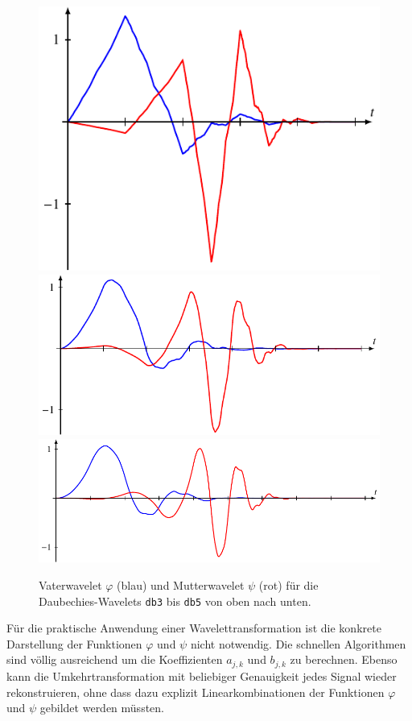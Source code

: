 \begin{figure}
\includegraphics{chapters/7-algo/images/db3.pdf}\\
\includegraphics{chapters/7-algo/images/db4.pdf}\\
\includegraphics{chapters/7-algo/images/db5.pdf}
\caption{Vaterwavelet $\varphi$ (blau) und Mutterwavelet $\psi$
(rot) für die Daubechies-Wavelets \texttt{db3} bis \texttt{db5}
von oben nach unten.
\label{buch:algo:db2}}
\end{figure}%
Für die praktische Anwendung einer Wavelettransformation ist
die konkrete Darstellung der Funktionen $\varphi$ und $\psi$
nicht notwendig.
Die schnellen Algorithmen sind völlig ausreichend um die
Koeffizienten $a_{j,k}$ und $b_{j,k}$ zu berechnen.
Ebenso kann die Umkehrtransformation mit beliebiger Genauigkeit
jedes Signal wieder rekonstruieren, ohne dass dazu explizit 
Linearkombinationen der Funktionen $\varphi$ und $\psi$ gebildet
werden müssten.

